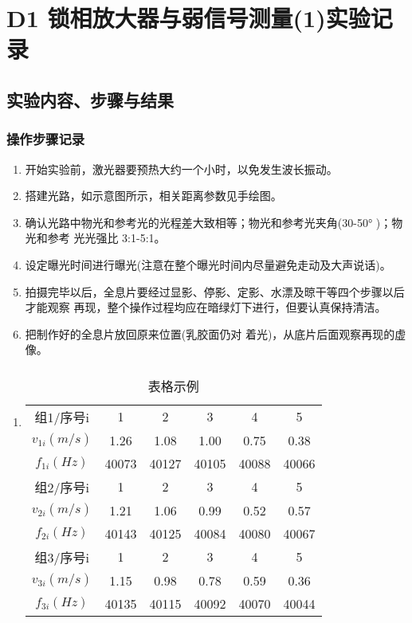\documentclass[dvipsnames, svgnames,a4paper,11pt]{article}
\begin{document}
	\section{ D1 锁相放大器与弱信号测量(1)\quad\heiti 实验记录}
	
	\subsection{实验内容、步骤与结果}
	
	\subsubsection{操作步骤记录}
	\begin{enumerate}
		\item 开始实验前，激光器要预热大约一个小时，以免发生波长振动。
		\item 搭建光路，如示意图所示，相关距离参数见手绘图。
		\item 确认光路中物光和参考光的光程差大致相等；物光和参考光夹角(30-50° )；物光和参考
		光光强比 3:1-5:1。
		\item 设定曝光时间进行曝光(注意在整个曝光时间内尽量避免走动及大声说话)。
		\item 拍摄完毕以后，全息片要经过显影、停影、定影、水漂及晾干等四个步骤以后才能观察
		再现，整个操作过程均应在暗绿灯下进行，但要认真保持清洁。
		\item 把制作好的全息片放回原来位置(乳胶面仍对
		着光)，从底片后面观察再现的虚像。

	\end{enumerate}	
	
	\subsubsection{}
	\begin{enumerate}
		\item \begin{table}[h]
			\centering
			\caption{表格示例}
			\label{tab:tab1}
			\begin{tabular}{|c|c|c|c|c|c|}
				\hline
				组1/序号i & 1 & 2 & 3 & 4 & 5 \\
				$v_{1i}(m/s)$ & 1.26 & 1.08 & 1.00 & 0.75 & 0.38 \\
				$f_{1i}(Hz)$ & 40073 & 40127 & 40105 & 40088 & 40066 \\
				\hline
				组2/序号i & 1 & 2 & 3 & 4 & 5 \\
				$v_{2i}(m/s)$ & 1.21 & 1.06 & 0.99 & 0.52 & 0.57 \\
				$f_{2i}(Hz)$ & 40143 & 40125 & 40084 & 40080 & 40067 \\
				\hline
				组3/序号i & 1 & 2 & 3 & 4 & 5 \\
				$v_{3i}(m/s)$ & 1.15 & 0.98 & 0.78 & 0.59 & 0.36 \\
				$f_{3i}(Hz)$ & 40135 & 40115 & 40092 & 40070 & 40044 \\
				\hline
			\end{tabular}
		\end{table}		
	\end{enumerate}
	
\end{document}
